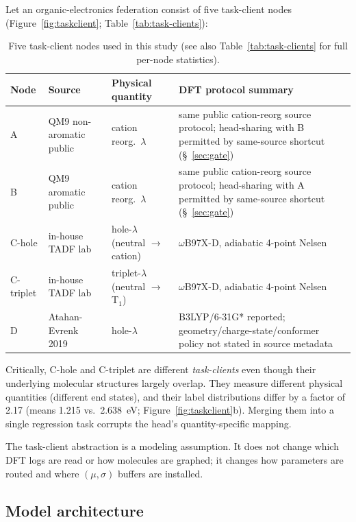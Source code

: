 \documentclass[11pt,a4paper]{article}
\begin{document}
Let an organic-electronics federation consist of five task-client nodes (Figure~\ref{fig:taskclient}; Table~\ref{tab:task-clients}):

\begin{table}[h]
\centering
\small
\caption{Five task-client nodes used in this study (see also Table~\ref{tab:task-clients} for full per-node statistics).}\label{tab:task-clients-inline}
\begin{tabularx}{\textwidth}{@{}l l l X@{}}
\toprule
Node & Source & Physical quantity & DFT protocol summary \\
\midrule
A         & QM9 non-aromatic public & cation reorg.\ $\lambda$         & same public cation-reorg source protocol; head-sharing with B permitted by same-source shortcut (\S~\ref{sec:gate}) \\
B         & QM9 aromatic public     & cation reorg.\ $\lambda$         & same public cation-reorg source protocol; head-sharing with A permitted by same-source shortcut (\S~\ref{sec:gate}) \\
C-hole    & in-house TADF lab       & hole-$\lambda$ (neutral $\to$ cation) & $\omega$B97X-D, adiabatic 4-point Nelsen~\citep{Nelsen1987} \\
C-triplet & in-house TADF lab       & triplet-$\lambda$ (neutral $\to$ T$_1$) & $\omega$B97X-D, adiabatic 4-point Nelsen~\citep{Nelsen1987} \\
D         & Atahan-Evrenk 2019~\citep{AtahanEvrenk2019_RE} & hole-$\lambda$ & B3LYP/6-31G* reported; geometry/charge-state/conformer policy not stated in source metadata \\
\bottomrule
\end{tabularx}
\end{table}

Critically, C-hole and C-triplet are different \emph{task-clients} even though their underlying molecular structures largely overlap. They measure different physical quantities (different end states), and their label distributions differ by a factor of 2.17 (means \SI{1.215}{} vs.\ \SI{2.638}{\eV}; Figure~\ref{fig:taskclient}b). Merging them into a single regression task corrupts the head's quantity-specific mapping.

The task-client abstraction is a modeling assumption. It does not change which DFT logs are read or how molecules are graphed; it changes how parameters are routed and where $(\mu, \sigma)$ buffers are installed.

\subsection{Model architecture}\label{sec:model}
\end{document}
